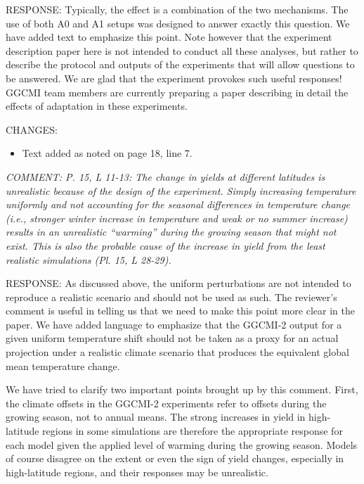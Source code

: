 \documentclass[gmd, manuscript]{copernicus} %
\begin{document}
RESPONSE: Typically, the effect is a combination of the two mechanisms. The use of both A0 and A1 setups was designed to answer exactly this question. We have added text to emphasize this point. Note however that the experiment description paper here is not intended to conduct all these analyses, but rather to describe the protocol and outputs of the experiments that will allow questions to be answered. We are glad that the experiment provokes such useful responses! GGCMI team members are currently preparing a paper describing in detail the effects of adaptation in these experiments.
\smallskip

CHANGES:
\begin{itemize}
    \item Text added as noted on page 18, line 7.
\end{itemize}

\smallskip

\textcolor{dark-gray}{\textit{COMMENT: P. 15, L 11-13: The change in yields at different latitudes is unrealistic because of the design of the experiment. Simply increasing temperature uniformly and not accounting for the seasonal differences in temperature change (i.e., stronger winter increase in temperature and weak or no summer increase) results in an unrealistic “warming” during the growing season that might not exist. This is also the probable cause of the increase in yield from the least realistic simulations (Pl. 15, L 28-29).}}

RESPONSE: As discussed above, the uniform perturbations are not intended to reproduce a realistic scenario and should not be used as such. The reviewer’s comment is useful in telling us that we need to make this point more clear in the paper. We have added language to emphasize that the GGCMI-2 output for a given uniform temperature shift should not be taken as a proxy for an actual projection under a realistic climate scenario that produces the equivalent global mean temperature change. 

We have tried to clarify two important points brought up by this comment. First, the climate offsets in the GGCMI-2 experiments refer to offsets during the growing season, not to annual means. The strong increases in yield in high-latitude regions in some simulations are therefore the appropriate response for each model given the applied level of warming during the growing season. Models of course disagree on the extent or even the sign of yield changes, especially in high-latitude regions, and their responses may be unrealistic.
\end{document}
